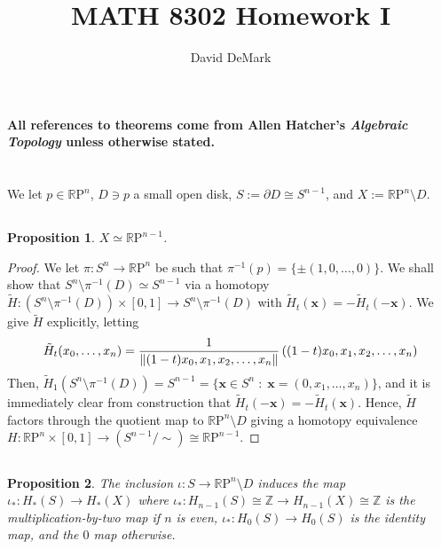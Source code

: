 \documentclass[english]{article}
\title{MATH 8302 Homework I}
\author{David DeMark}
\date{\due}
\renewcommand\vec{\mathbf}
\DeclarePairedDelimiter\norm{\lVert}{\rVert}%
\newcommand{\RR}{\mathbb{R}}
\newcommand{\ZZ}{\mathbb{Z}}
\newcommand{\prob}[1]{\setcounter{section}{#1-1}\section{}}
\newcommand{\prt}[1]{\setcounter{subsection}{#1-1}\subsection{}}
\newtheorem*{proposition*}{Proposition}
\theoremstyle{remark}
\theoremstyle{definition}
\newcommand{\tH}{\tilde{H}}
\newcommand{\del}{\partial}
\newcommand{\RP}{{\RR\mathrm{P}}}
\begin{document}
\maketitle

\noindent\textbf{All references to theorems come from Allen Hatcher's \emph{Algebraic Topology} unless otherwise stated.}
\prob{1} We let $p\in \RP^n$, $D\ni p$ a small open disk, $S:=\del D \cong S^{n-1}$, and $X:=\RP^n\setminus D$.  
\prt{1} \begin{proposition*}
	$X\simeq \RP^{n-1}$.
\end{proposition*}
\begin{proof}
	We let $\pi: S^n\to \RP^n$ be such that $\pi^{-1}(p)=\{\pm (1,0,\ldots,0)\}$. We shall show that $S^n\setminus \pi^{-1}(D)\simeq S^{n-1}$ via a homotopy $\tH:\left(S^n\setminus \pi^{-1}(D)\right)\times [0,1]\to S^n\setminus \pi^{-1}(D)$ with $\tH_t(\vec{x})=-\tH_t(-\vec{x})$. We give $\tH$ explicitly, letting 
	$$\tH_t(x_0,\ldots,x_n)=\frac{1}{\norm{(1-t)x_0,x_1,x_2,\ldots,x_n}}\left((1-t)x_0,x_1,x_2,\ldots,x_n\right)$$
	Then, $\tH_1(S^n\setminus \pi^{-1}(D))=S^{n-1}=\{\vec{x}\in S^n\;:\; \vec{x}=(0,x_1,\ldots,x_n)\}$, and it is immediately clear from construction that $\tH_t(-\vec{x})=-\tH_t(\vec{x})$. Hence, $\tH$ factors through the quotient map to $\RP^n\setminus D$ giving a homotopy equivalence $H:\RP^n\times [0,1]\to (S^{n-1}/\sim)\cong \RP^{n-1}$.
\end{proof}
\prt{2}
\begin{proposition*}The inclusion $\iota:S\to \RP^n\setminus D$ induces the map $\iota_*:H_*(S)\to H_*(X)$ where $\iota_*:H_{n-1}(S)\cong \ZZ\to H_{n-1}(X)\cong \ZZ$ is the multiplication-by-two map if $n$ is even, $\iota_*:H_0(S)\to H_0(S)$ is the identity map, and the $0$ map otherwise. \end{proposition*}
\end{document}
